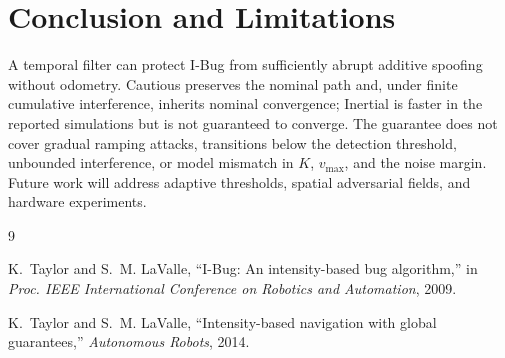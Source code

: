 \documentclass[10pt,a4paper]{article}
\begin{document}
\section{Conclusion and Limitations}
A temporal filter can protect I-Bug from sufficiently abrupt additive spoofing without odometry. Cautious preserves the nominal path and, under finite cumulative interference, inherits nominal convergence; Inertial is faster in the reported simulations but is not guaranteed to converge. The guarantee does not cover gradual ramping attacks, transitions below the detection threshold, unbounded interference, or model mismatch in $K$, $v_{\max}$, and the noise margin. Future work will address adaptive thresholds, spatial adversarial fields, and hardware experiments.

\begin{thebibliography}{9}
\small

K.~Taylor and S.~M. LaValle,
``I-Bug: An intensity-based bug algorithm,''
in \emph{Proc. IEEE International Conference on Robotics and Automation}, 2009.

K.~Taylor and S.~M. LaValle,
``Intensity-based navigation with global guarantees,''
\emph{Autonomous Robots}, 2014.
\end{thebibliography}
\end{document}
